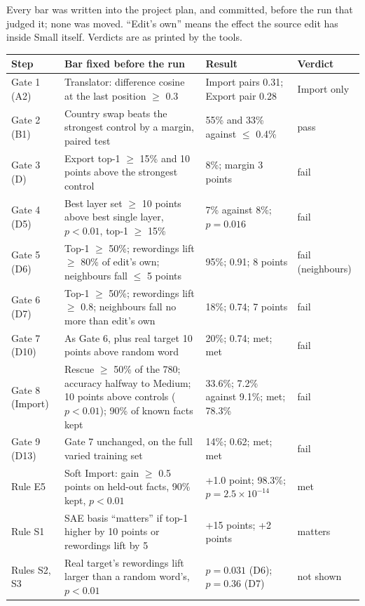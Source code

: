 \documentclass[11pt,twocolumn]{article}
\begin{document}
Every bar was written into the project plan, and committed, before the run that judged it; none was moved. ``Edit's own'' means the effect the source edit has inside Small itself. Verdicts are as printed by the tools.

\begin{center}
\small
\begin{tabular}{@{}p{}p{}p{}p{}@{}}
\toprule
\textbf{Step} & \textbf{Bar fixed before the run} & \textbf{Result} & \textbf{Verdict}\\
\midrule
Gate 1 (A2) & Translator: difference cosine at the last position $\ge$ 0.3 & Import pairs 0.31; Export pair 0.28 & Import only\\
Gate 2 (B1) & Country swap beats the strongest control by a margin, paired test & 55\% and 33\% against $\le$ 0.4\% & pass\\
Gate 3 (D) & Export top-1 $\ge$ 15\% and 10 points above the strongest control & 8\%; margin 3 points & fail\\
Gate 4 (D5) & Best layer set $\ge$ 10 points above best single layer, $p<0.01$, top-1 $\ge$ 15\% & 7\% against 8\%; $p=0.016$ & fail\\
Gate 5 (D6) & Top-1 $\ge$ 50\%; rewordings lift $\ge$ 80\% of edit's own; neighbours fall $\le$ 5 points & 95\%; 0.91; 8 points & fail (neighbours)\\
Gate 6 (D7) & Top-1 $\ge$ 50\%; rewordings lift $\ge$ 0.8; neighbours fall no more than edit's own & 18\%; 0.74; 7 points & fail\\
Gate 7 (D10) & As Gate 6, plus real target 10 points above random word & 20\%; 0.74; met; met & fail\\
Gate 8 (Import) & Rescue $\ge$ 50\% of the 780; accuracy halfway to Medium; 10 points above controls ($p<0.01$); 90\% of known facts kept & 33.6\%; 7.2\% against 9.1\%; met; 78.3\% & fail\\
Gate 9 (D13) & Gate 7 unchanged, on the full varied training set & 14\%; 0.62; met; met & fail\\
Rule E5 & Soft Import: gain $\ge$ 0.5 points on held-out facts, 90\% kept, $p<0.01$ & +1.0 point; 98.3\%; $p=2.5\times10^{-14}$ & met\\
Rule S1 & SAE basis ``matters'' if top-1 higher by 10 points or rewordings lift by 5 & +15 points; +2 points & matters\\
Rules S2, S3 & Real target's rewordings lift larger than a random word's, $p<0.01$ & $p=0.031$ (D6); $p=0.36$ (D7) & not shown\\
\bottomrule
\end{tabular}
\end{center}
\end{document}
